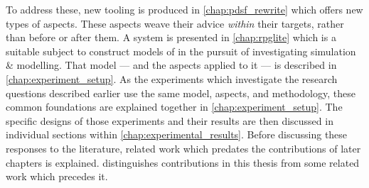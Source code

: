 To address these, new tooling is produced in \cref{chap:pdsf_rewrite} which
offers new types of aspects. These aspects weave their advice \emph{within}
their targets, rather than before or after them. A system is presented in
\cref{chap:rpglite} which is a suitable subject to construct models of in the
pursuit of investigating \aspectoriented{} simulation \& modelling. That model
--- and the aspects applied to it --- is described in
\cref{chap:experiment_setup}. As the experiments which investigate the research
questions described earlier use the same model, aspects, and methodology, these
common foundations are explained together in \cref{chap:experiment_setup}. The
specific designs of those experiments and their results are then discussed in
individual sections within \cref{chap:experimental_results}. Before discussing
these responses to the literature, related work which predates the contributions
of later chapters is explained.  distinguishes
contributions in this thesis from some related work which precedes it.
